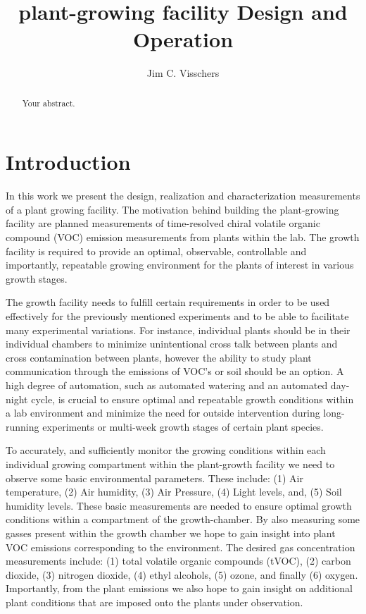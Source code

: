 \documentclass[reprint,superscriptaddress,aps,amsmath,amssymb]{revtex4-1}
\begin{document}
\title{plant-growing facility Design and Operation}
\author{Jim C. Visschers} 

\begin{abstract}
Your abstract.
\end{abstract}
\maketitle
\tableofcontents
\section{Introduction}
In this work we present the design, realization and characterization measurements of a plant growing facility. The motivation behind building the plant-growing facility are planned measurements of time-resolved chiral volatile organic compound (VOC) emission measurements from plants within the lab. The growth facility is required to provide an optimal, observable, controllable and importantly, repeatable growing environment for the plants of interest in various growth stages. 

The growth facility needs to fulfill certain requirements in order to be used effectively for the previously mentioned experiments and to be able to facilitate many experimental variations. For instance, individual plants should be in their individual chambers to minimize unintentional cross talk between plants and cross contamination between plants, however the ability to study plant communication through the emissions of VOC's or soil should be an option. A high degree of automation, such as automated watering and an automated day-night cycle, is crucial to ensure optimal and repeatable growth conditions within a lab environment and minimize the need for outside intervention during long-running experiments or multi-week growth stages of certain plant species. 

To accurately, and sufficiently monitor the growing conditions within each individual growing compartment within the plant-growth facility we need to observe some basic environmental parameters. These include: (1) Air temperature, (2) Air humidity, (3) Air Pressure, (4) Light levels, and, (5) Soil humidity levels. These basic measurements are needed to ensure optimal growth conditions within a compartment of the growth-chamber. By also measuring some gasses present within the growth chamber we hope to gain insight into plant VOC emissions corresponding to the environment. The desired gas concentration measurements include: (1) total volatile organic compounds (tVOC), (2) carbon dioxide, (3) nitrogen dioxide, (4) ethyl alcohols, (5) ozone, and finally (6) oxygen. Importantly, from the plant emissions we also hope to gain insight on additional plant conditions that are imposed onto the plants under observation.
\end{document}
